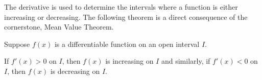 \documentclass[handout]{ximera}
\begin{document}










The derivative is used to determine the intervals where a function is either increasing or decreasing.
The following theorem is a direct consequence of the cornerstone, Mean Value Theorem.


\begin{theorem}
Suppose $f(x)$ is a differentiable function on an open interval $I$.

 If $f'(x) > 0$ on $I$, 
then $f(x)$ is increasing on $I$ and similarly, if $f'(x) < 0$ on $I$, then $f(x)$ is decreasing on $I$.
\end{theorem}
\end{document}
